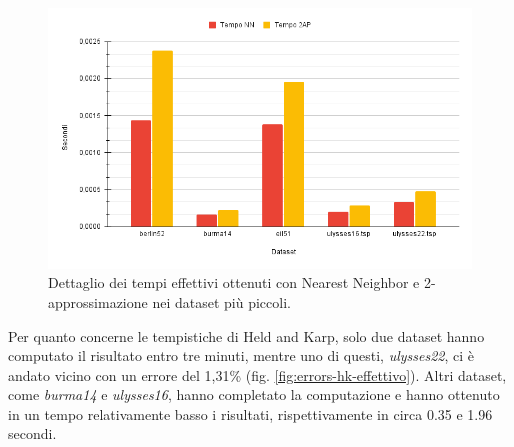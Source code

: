 \begin{figure}[H]
	\centering
	\includegraphics[width=1\textwidth]{res/images/time/time-detail-nn-2ap.png}
	\caption{Dettaglio dei tempi effettivi ottenuti con Nearest Neighbor e 2-approssimazione nei dataset più piccoli.}
	\label{fig:time-detail-nn-2ap}
\end{figure}

Per quanto concerne le tempistiche di Held and Karp, solo due dataset hanno computato il risultato entro tre minuti, mentre uno di questi, \textit{ulysses22}, ci è andato vicino con un errore del 1,31\% (fig. \ref{fig:errors-hk-effettivo}). Altri dataset, come \textit{burma14} e \textit{ulysses16}, hanno completato la computazione e hanno ottenuto in un tempo relativamente basso i risultati, rispettivamente in circa 0.35 e 1.96 secondi.